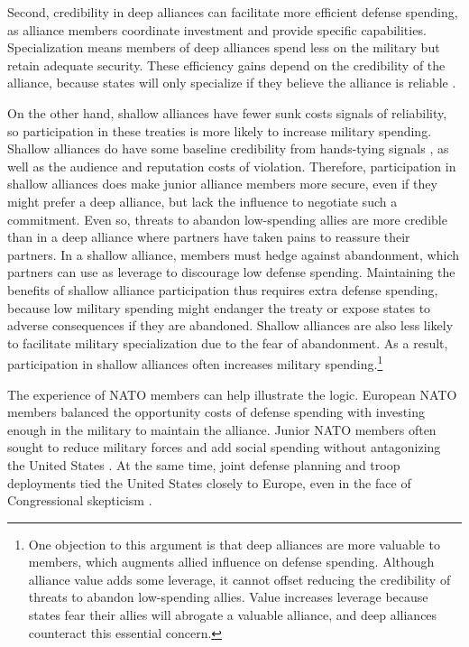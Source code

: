 \documentclass[12pt]{article}
\begin{document}
Second, credibility in deep alliances can facilitate more efficient defense spending, as alliance members coordinate investment and provide specific capabilities. 
Specialization means members of deep alliances spend less on the military but retain adequate security.
These efficiency gains depend on the credibility of the alliance, because states will only specialize if they believe the alliance is reliable \citep{Leeds2003a}.  


On the other hand, shallow alliances have fewer sunk costs signals of reliability, so participation in these treaties is more likely to increase military spending. 
Shallow alliances do have some baseline credibility from hands-tying signals \citep{Fearon1997}, as well as the audience \citep{Morrow2000} and reputation \citep{Gibler2008, Crescenzietal2012} costs of violation.
Therefore, participation in shallow alliances does make junior alliance members more secure, even if they might prefer a deep alliance, but lack the influence to negotiate such a commitment. 
Even so, threats to abandon low-spending allies are more credible than in a deep alliance where partners have taken pains to reassure their partners.  
In a shallow alliance, members must hedge against abandonment, which partners can use as leverage to discourage low defense spending. 
Maintaining the benefits of shallow alliance participation thus requires extra defense spending, because low military spending might endanger the treaty or expose states to adverse consequences if they are abandoned. 
Shallow alliances are also less likely to facilitate military specialization due to the fear of abandonment. 
As a result, participation in shallow alliances often increases military spending.\footnote{
One objection to this argument is that deep alliances are more valuable to members, which augments allied influence on defense spending. 
Although alliance value adds some leverage, it cannot offset reducing the credibility of threats to abandon low-spending allies.
Value increases leverage because states fear their allies will abrogate a valuable alliance, and deep alliances counteract this essential concern. 
}


The experience of NATO members can help illustrate the logic. 
European NATO members balanced the opportunity costs of defense spending with investing enough in the military to maintain the alliance. 
Junior NATO members often sought to reduce military forces and add social spending without antagonizing the United States \citep[pg. 182-3]{Sayle2019}.
At the same time, joint defense planning and troop deployments tied the United States closely to Europe, even in the face of Congressional skepticism \citep[pg 175]{Sayle2019}. 
 
\end{document}
